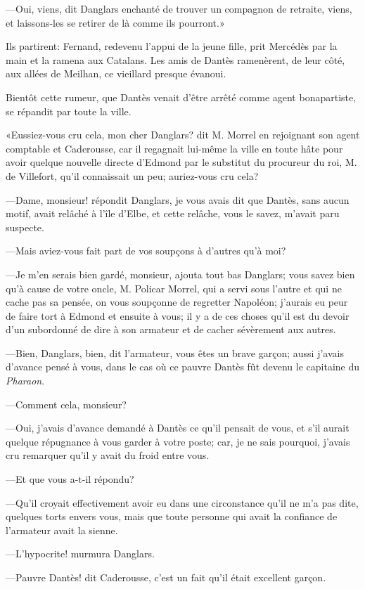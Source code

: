 —Oui, viens, dit Danglars enchanté de trouver un compagnon de retraite, viens, et laissons-les se retirer de là comme ils pourront.»

Ils partirent: Fernand, redevenu l'appui de la jeune fille, prit Mercédès par la main et la ramena aux Catalans. Les amis de Dantès ramenèrent, de leur côté, aux allées de Meilhan, ce vieillard presque évanoui.

Bientôt cette rumeur, que Dantès venait d'être arrêté comme agent bonapartiste, se répandit par toute la ville.

«Eussiez-vous cru cela, mon cher Danglars? dit M. Morrel en rejoignant son agent comptable et Caderousse, car il regagnait lui-même la ville en toute hâte pour avoir quelque nouvelle directe d'Edmond par le substitut du procureur du roi, M. de Villefort, qu'il connaissait un peu; auriez-vous cru cela?

—Dame, monsieur! répondit Danglars, je vous avais dit que Dantès, sans aucun motif, avait relâché à l'île d'Elbe, et cette relâche, vous le savez, m'avait paru suspecte.

—Mais aviez-vous fait part de vos soupçons à d'autres qu'à moi?

—Je m'en serais bien gardé, monsieur, ajouta tout bas Danglars; vous savez bien qu'à cause de votre oncle, M. Policar Morrel, qui a servi sous l'autre et qui ne cache pas sa pensée, on vous soupçonne de regretter Napoléon; j'aurais eu peur de faire tort à Edmond et ensuite à vous; il y a de ces choses qu'il est du devoir d'un subordonné de dire à son armateur et de cacher sévèrement aux autres.

—Bien, Danglars, bien, dit l'armateur, vous êtes un brave garçon; aussi j'avais d'avance pensé à vous, dans le cas où ce pauvre Dantès fût devenu le capitaine du \textit{Pharaon}.

—Comment cela, monsieur?

—Oui, j'avais d'avance demandé à Dantès ce qu'il pensait de vous, et s'il aurait quelque répugnance à vous garder à votre poste; car, je ne sais pourquoi, j'avais cru remarquer qu'il y avait du froid entre vous.

—Et que vous a-t-il répondu?

—Qu'il croyait effectivement avoir eu dans une circonstance qu'il ne m'a pas dite, quelques torts envers vous, mais que toute personne qui avait la confiance de l'armateur avait la sienne.

—L'hypocrite! murmura Danglars.

—Pauvre Dantès! dit Caderousse, c'est un fait qu'il était excellent garçon.


